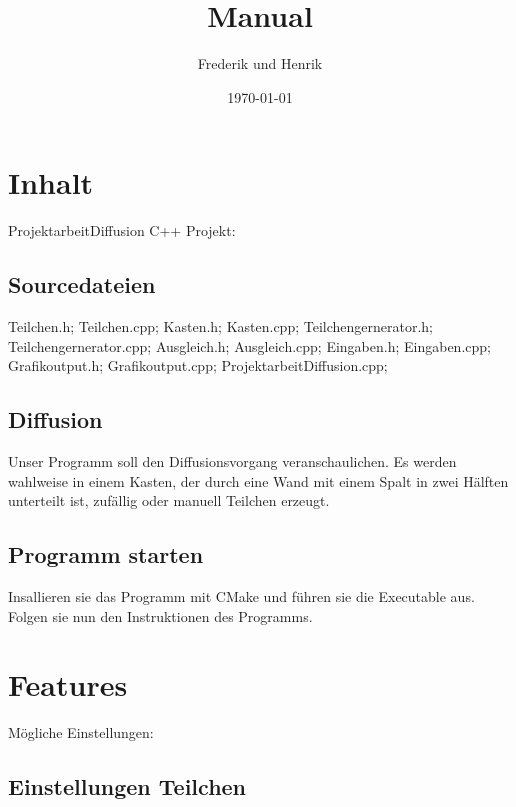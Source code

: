 \documentclass[14pt,a4paper]{scrartcl}
\title{Manual}
\author{Frederik und Henrik}
\date{\today}
\begin{document}
 
\maketitle
\tableofcontents
\section{Inhalt}
ProjektarbeitDiffusion C++ Projekt:

\subsection{\textbf{Sourcedateien}}
Teilchen.h;
Teilchen.cpp;
Kasten.h;
Kasten.cpp;
Teilchengernerator.h;
Teilchengernerator.cpp;
Ausgleich.h;
Ausgleich.cpp;
Eingaben.h;
Eingaben.cpp;
Grafikoutput.h;
Grafikoutput.cpp;
ProjektarbeitDiffusion.cpp;

\subsection{Diffusion}
Unser Programm soll den Diffusionsvorgang veranschaulichen.
Es werden wahlweise in einem Kasten, der durch eine Wand mit einem Spalt in zwei Hälften unterteilt ist, zufällig oder manuell Teilchen erzeugt.

\subsection{Programm starten}
Insallieren sie das Programm mit CMake und führen sie die Executable aus.
Folgen sie nun den Instruktionen des Programms.

\section{Features}
Mögliche Einstellungen:

\subsection{Einstellungen Teilchen}
\end{document}
